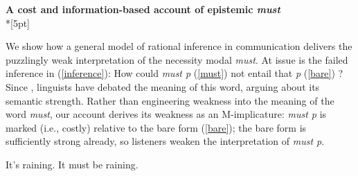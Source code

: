 \documentclass[11pt]{article}
\begin{document}
\begin{center}\textbf{A cost and information-based account of epistemic \textit{must}}\\*[5pt]
\end{center}

\vspace{-11pt}


We show how a general model of rational inference in communication delivers the puzzlingly weak interpretation of the necessity modal \emph{must}. At issue is the failed inference in (\ref{inference}): How could \emph{must p} (\ref{must}) not entail that \emph{p} (\ref{bare})
? Since \citealt{karttunen1972}, linguists have debated the meaning of this word, arguing about its semantic strength. Rather than engineering weakness into the meaning of the word  \emph{must}, our account derives its weakness as an M-implicature: \emph{must p} is marked (i.e., costly) relative to the bare form (\ref{bare}); the bare form is sufficiently strong already, so listeners weaken the interpretation of \emph{must p}.

\vspace{-8pt}
\begin{exe}
\ex\label{inference} 
\begin{xlist}
\ex\label{bare}  It's raining.
\ex\label{must} It must be raining.
\end{xlist}
\end{exe}
\vspace{-8pt}
\end{document}
